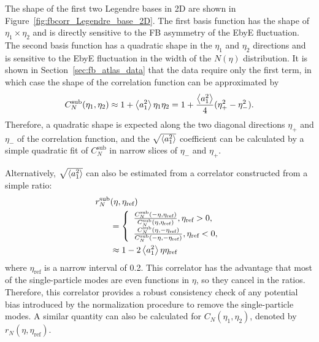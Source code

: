 The shape of the first two Legendre bases in 2D are shown in Figure~\ref{fig:fbcorr_Legendre_base_2D}. The first basis function has the shape of $\eta_1 \times \eta_2$ and is directly sensitive to the FB asymmetry of the EbyE fluctuation. The second basis function has a quadratic shape in the $\eta_1$ and $\eta_2$ directions and is sensitive to the EbyE fluctuation in the width of the $N(\eta)$ distribution. It is shown in Section~\ref{sec:fb_atlas_data} that the data require only the first term, in which case the shape of the correlation function can be approximated by
\begin{equation}
C_N^\text{sub}(\eta_1, \eta_2) \approx 1 + \left\langle a_1^2\right\rangle\eta_1\eta_2 = 1 + \frac{\left\langle a_1^2\right\rangle}{4}(\eta_+^2 - \eta_-^2).
\end{equation}
Therefore, a quadratic shape is expected along the two diagonal directions $\eta_+$ and $\eta_-$ of the correlation function, and the $\sqrt{\left\langle a_1^2\right\rangle}$ coefficient can be calculated by a simple quadratic fit of $C_N^\text{sub}$ in narrow slices of $\eta_-$ and $\eta_+$.

Alternatively, $\sqrt{\left\langle a_1^2\right\rangle}$ can also be estimated from a correlator constructed from a simple ratio:
\begin{equation}
\begin{split}
r_N^\text{sub}&(\eta, \eta_\text{ref}) \\
&=\left\{\begin{array}{l} \frac{C_N^\text{sub}(-\eta, \eta_\text{ref})}{C_N^\text{sub}(\eta, \eta_\text{ref})}, \eta_\text{ref}>0, \\ \frac{C_N^\text{sub}(\eta, -\eta_\text{ref})}{C_N^\text{sub}(-\eta, -\eta_\text{ref})}, \eta_\text{ref}<0, \end{array}\right. \\
&\approx 1 - 2 \left\langle a_1^2\right\rangle \eta \eta_\text{ref}
\end{split}
\end{equation}
where $\eta_\text{ref}$ is a narrow interval of 0.2. This correlator has the advantage that most of the single-particle modes are even functions in $\eta$, so they cancel in the ratios. Therefore, this correlator provides a robust consistency check of any potential bias introduced by the normalization procedure to remove the single-particle modes. A similar quantity can also be calculated for $C_N(\eta_1, \eta_2)$, denoted by $r_N(\eta, \eta_\text{ref})$.

